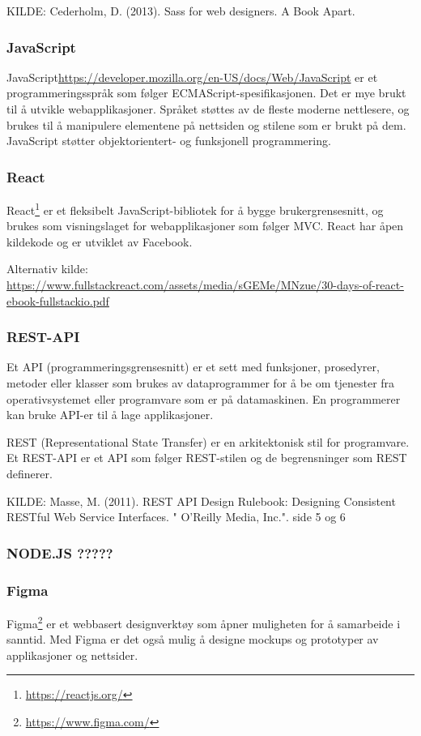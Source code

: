KILDE: Cederholm, D. (2013). Sass for web designers. A Book Apart.

\subsubsection{JavaScript}
JavaScript\url{https://developer.mozilla.org/en-US/docs/Web/JavaScript} er et programmeringsspråk som følger ECMAScript-spesifikasjonen. Det er mye brukt til å utvikle webapplikasjoner. Språket støttes av de fleste moderne nettlesere, og brukes til å manipulere elementene på nettsiden og stilene som er brukt på dem. JavaScript støtter objektorientert- og funksjonell programmering.

\subsubsection{React}
React\footnote{\url{https://reactjs.org/}} er et fleksibelt JavaScript-bibliotek for å bygge brukergrensesnitt, og brukes som visningslaget for webapplikasjoner som følger MVC. React har åpen kildekode og er utviklet av Facebook.

Alternativ kilde: \url{https://www.fullstackreact.com/assets/media/sGEMe/MNzue/30-days-of-react-ebook-fullstackio.pdf}

\subsubsection{REST-API}
Et API (programmeringsgrensesnitt) er et sett med funksjoner, prosedyrer, metoder eller klasser som brukes av dataprogrammer for å be om tjenester fra operativsystemet eller programvare som er på datamaskinen. En programmerer kan bruke API-er til å lage applikasjoner.

REST (Representational State Transfer) er en arkitektonisk stil for programvare. Et REST-API er et API som følger REST-stilen og de begrensninger som REST definerer.

KILDE: Masse, M. (2011). REST API Design Rulebook: Designing Consistent RESTful Web Service Interfaces. " O'Reilly Media, Inc.".
side 5 og 6

\subsubsection{NODE.JS ?????}

\subsubsection{Figma}
Figma\footnote{\url{https://www.figma.com/}} er et webbasert designverktøy som åpner muligheten for å samarbeide i sanntid. Med Figma er det også mulig å designe mockups og prototyper av applikasjoner og nettsider.


